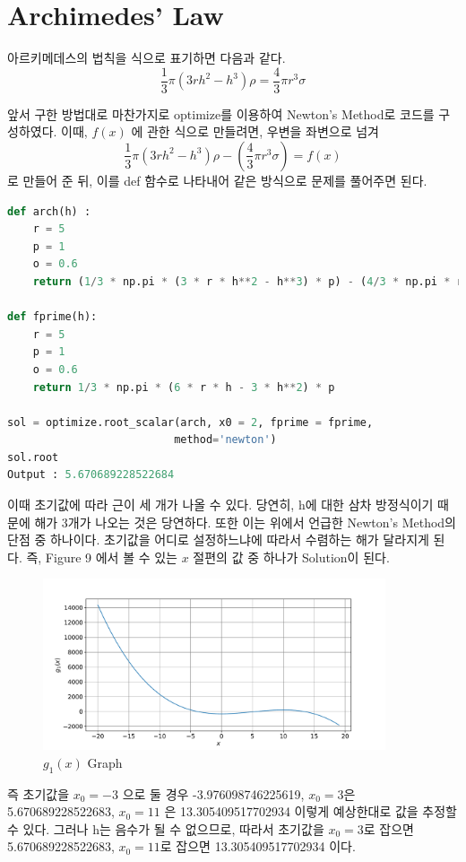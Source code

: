 \documentclass[11pt]{article}
\begin{document}
\clearpage















\section{Archimedes’ Law}
아르키메데스의 법칙을 식으로 표기하면 다음과 같다.
$$
\frac{1}{3}\pi (3rh^2 - h^3) \rho = \frac{4}{3}\pi r^3\sigma
$$

\noindent  
앞서 구한 방법대로 마찬가지로  optimize를 이용하여 Newton's Method로 코드를 구성하였다. 이때, $f(x)$ 에 관한 식으로 만들려면,  우변을 좌변으로 넘겨
$$
\frac{1}{3}\pi (3rh^2 - h^3) \rho - ( \frac{4}{3}\pi r^3\sigma ) = f(x) 
$$
로 만들어 준 뒤, 이를 def 함수로 나타내어 같은 방식으로 문제를 풀어주면 된다. 
\begin{lstlisting}[language=Python]
def arch(h) :
    r = 5
    p = 1
    o = 0.6
    return (1/3 * np.pi * (3 * r * h**2 - h**3) * p) - (4/3 * np.pi * r**3 * o)

def fprime(h):
    r = 5
    p = 1
    o = 0.6
    return 1/3 * np.pi * (6 * r * h - 3 * h**2) * p

sol = optimize.root_scalar(arch, x0 = 2, fprime = fprime, 
                          method='newton')
sol.root
Output : 5.670689228522684
\end{lstlisting}

이때 초기값에 따라 근이 세 개가 나올 수 있다. 당연히, h에 대한 삼차 방정식이기 때문에 해가 3개가 나오는 것은 당연하다. 또한 이는 위에서 언급한 Newton's Method의 단점 중 하나이다. 초기값을 어디로 설정하느냐에 따라서 수렴하는 해가 달라지게 된다. 즉, Figure 9 에서 볼 수 있는 $x$ 절편의 값 중 하나가 Solution이 된다.

\begin{figure}[!ht]
  \centering
  \includegraphics[width=0.9\textwidth]{Newton_Method4.pdf}
  \caption{$g_1(x)$ Graph}
\end{figure}

즉 초기값을 $x_0 = -3$ 으로 둘 경우 -3.976098746225619, $x_0 = 3$은 5.670689228522683, $x_0 = 11$ 은 13.305409517702934 이렇게 예상한대로 값을 추정할 수 있다. 그러나 h는 음수가 될 수 없으므로, 따라서 초기값을 $x_0 = 3$로 잡으면 5.670689228522683, $x_0 = 11$로 잡으면 13.305409517702934 이다.
\clearpage
\end{document}
